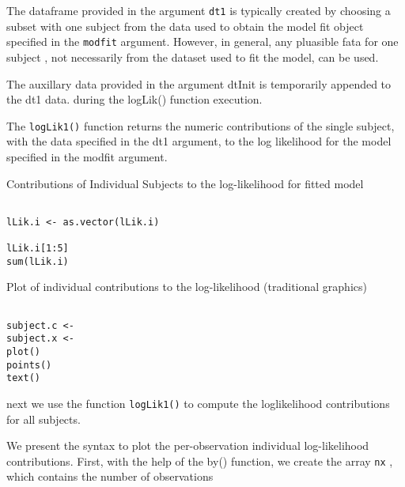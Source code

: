 
The dataframe provided in the argument \texttt{dt1} is typically created by choosing a subset with one subject from the data used to obtain the model fit object specified in the \texttt{modfit} argument.
However, in general, any pluasible fata for one subject , not necessarily from the dataset used to fit the model, can be used.


The auxillary data provided in the argument dtInit is temporarily appended to the dt1 data. during the logLik() function execution.



The \texttt{logLik1()} function returns the numeric contributions of the single subject, with the data specified in the dt1 argument, to the log likelihood
for the model specified in the modfit argument.



Contributions of Individual Subjects to the log-likelihood for fitted model


\begin{framed}
\begin{verbatim}

lLik.i <- as.vector(lLik.i)

lLik.i[1:5]
sum(lLik.i)

\end{verbatim}
\end{framed}

Plot of individual contributions to the log-likelihood (traditional graphics)
\begin{framed}
\begin{verbatim}

subject.c <-
subject.x <- 
plot()
points()
text()
\end{verbatim}
\end{framed}

next we use the function \texttt{logLik1()} to compute the loglikelihood
contributions for all subjects.

We present the syntax to plot the per-observation individual log-likelihood contributions.
First, with the help of the by() function, we create the array \texttt{nx} , which contains the number
of observations

